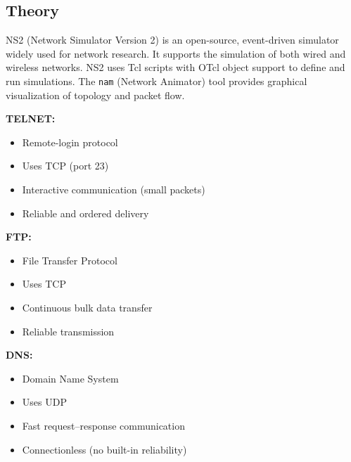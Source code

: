 \documentclass{article}
\begin{document}
\subsection{Theory}
NS2 (Network Simulator Version 2) is an open-source, event-driven simulator widely used for network research. It supports the simulation of both wired and wireless networks. NS2 uses Tcl scripts with OTcl object support to define and run simulations. The \texttt{nam} (Network Animator) tool provides graphical visualization of topology and packet flow.

\textbf{TELNET:}
\begin{itemize}
    \item Remote-login protocol
    \item Uses TCP (port 23)
    \item Interactive communication (small packets)
    \item Reliable and ordered delivery
\end{itemize}

\textbf{FTP:}
\begin{itemize}
    \item File Transfer Protocol
    \item Uses TCP
    \item Continuous bulk data transfer
    \item Reliable transmission
\end{itemize}

\textbf{DNS:}
\begin{itemize}
    \item Domain Name System
    \item Uses UDP
    \item Fast request--response communication
    \item Connectionless (no built-in reliability)
\end{itemize}
\end{document}
